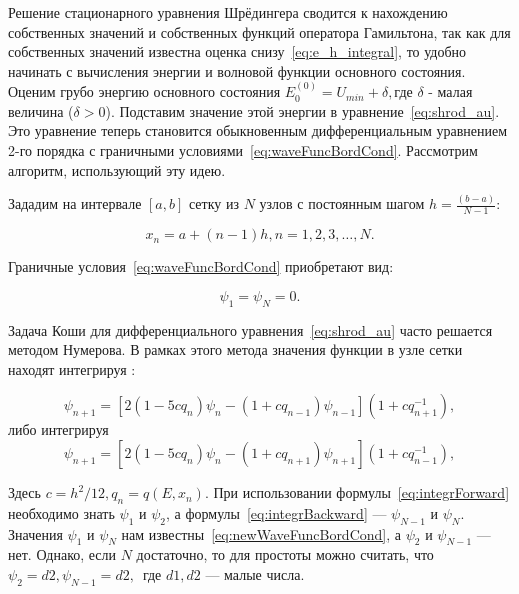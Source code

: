 \documentclass[a4paper,12pt]{article}
\begin{document}
Решение стационарного уравнения Шрёдингера сводится к нахождению собственных значений и собственных функций оператора Гамильтона, так как для собственных значений известна оценка снизу~\eqref{eq:e_h_integral}, то удобно начинать с вычисления энергии и волновой функции основного состояния.
Оценим грубо энергию основного состояния $E_0^{(0)}=U_{min} + \delta,$где $\delta$ - малая величина ($\delta > 0$).
Подставим значение этой энергии в уравнение~\eqref{eq:shrod_au}.
Это уравнение теперь становится обыкновенным дифференциальным уравнением 2-го порядка с граничными условиями~\eqref{eq:waveFuncBordCond}.
Рассмотрим алгоритм, использующий эту идею.

Зададим на интервале $\left[ a,b \right]$ сетку из $N$ узлов с постоянным шагом $h = \frac{(b-a)}{N-1}$:

\begin{equation}
    x_n=a+(n-1)h, n = 1,2,3,\dots,N.
    \label{eq:x_nodes}
\end{equation}

Граничные условия~\eqref{eq:waveFuncBordCond} приобретают вид:

\begin{equation}
    \psi_1 = \psi_N = 0.
    \label{eq:newWaveFuncBordCond}
\end{equation}

Задача Коши для дифференциального уравнения~\eqref{eq:shrod_au} часто решается методом Нумерова.
В рамках этого метода значения функции в узле сетки находят интегрируя \guillemetright:

\begin{equation}
    \psi_{n+1} = \left[ 2(1 - 5cq_n)\psi_n - (1 + cq_{n-1})\psi_{n-1} \right]\left( 1 + cq_{n+1}^{-1} \right),
    \label{eq:integrForward}
\end{equation}
либо интегрируя \guillemetright
\begin{equation}
    \psi_{n+1} = \left[ 2(1 - 5cq_n)\psi_n - (1 + cq_{n+1})\psi_{n+1} \right]\left( 1 + cq_{n-1}^{-1} \right),
    \label{eq:integrBackward}
\end{equation}

Здесь $c=h^2/12, q_n=q(E, x_n)$.
При использовании формулы~\eqref{eq:integrForward} необходимо знать $\psi_1$ и $\psi_2$, а формулы~\eqref{eq:integrBackward} --- $\psi_{N-1}$ и $\psi_N$.
Значения $\psi_1$ и $\psi_N$ нам известны~\eqref{eq:newWaveFuncBordCond}, а $\psi_2$ и $\psi_{N-1}$ --- нет.
Однако, если $N$ достаточно, то для простоты можно считать, что $\psi_2=d2, \psi_{N-1}=d2,$~где $d1, d2$ --- малые числа.
\end{document}
